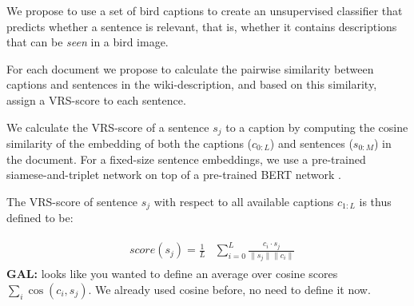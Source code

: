\documentclass[11pt,a4paper]{article}
\newcommand\gal[1]{\textcolor{bright}{\textbf{GAL:} #1 }}
\begin{document}
We propose to use a set of bird captions to create an unsupervised classifier that predicts whether a sentence is relevant, that is, whether it contains descriptions that can be {\em seen} in a bird image.

For each document we propose to calculate the pairwise similarity between captions and sentences in the wiki-description, and based on this similarity, assign a VRS-score to each sentence.



We calculate the VRS-score of a sentence $s_j$ to a caption by computing the cosine similarity of the embedding of both the captions ($c_{0:L}$) and sentences ($s_{0:M}$) in the document. For a fixed-size sentence embeddings, we use a pre-trained siamese-and-triplet network \citep{reimers2019sentence, Schroff_2015_CVPR} on top of a pre-trained BERT network  \cite{devlin2019bert}.


The VRS-score of sentence $s_j$ with respect to all available captions   $c_{1:L}$  is thus defined to be:


\begin{equation}
\begin{aligned}
\begin{split}
\label{eq:score}
&score(s_j)=  \frac{1}{L}
&\sum_{i=0}^{L} \frac{c_i\cdot s_j}{\| s_j\|\| c_i\| }
\end{split}
\end{aligned}
\end{equation}
\gal{looks like you wanted to define an average over cosine scores $\sum_i\cos(c_i, s_j)$. We already used cosine before, no need to define it now. }
\end{document}
